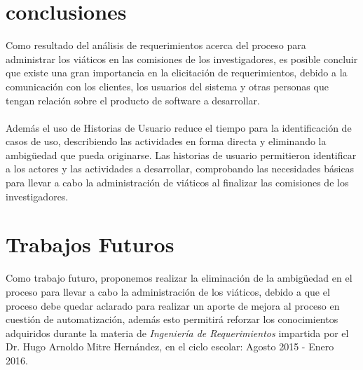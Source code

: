 \documentclass{report}
\begin{document}
    \section{conclusiones}
    Como resultado del análisis de requerimientos acerca del proceso para administrar los viáticos en las comisiones de los investigadores, es posible concluir que existe una gran importancia en la elicitación de requerimientos, debido a la comunicación con los clientes, los usuarios del sistema y otras personas que tengan relación sobre el producto de software a desarrollar.\\\\
Además el uso de Historias de Usuario reduce el tiempo para la identificación de casos de uso, describiendo las actividades en forma directa y eliminando la ambigüedad que pueda originarse. Las historias de usuario permitieron identificar a los actores y las actividades a desarrollar, comprobando las necesidades básicas para llevar a cabo la administración de viáticos al finalizar las comisiones de los investigadores.
    
    \section{Trabajos Futuros}
    Como trabajo futuro, proponemos realizar la eliminación de la ambigüedad en el proceso para llevar a cabo la administración de los viáticos, debido a que el proceso debe quedar aclarado para realizar un aporte de mejora al proceso en cuestión de automatización, además esto permitirá reforzar los conocimientos adquiridos durante la materia de \emph{Ingeniería de Requerimientos} impartida por el Dr. Hugo Arnoldo Mitre Hernández, en el ciclo escolar: Agosto 2015 - Enero 2016.
\end{document}

